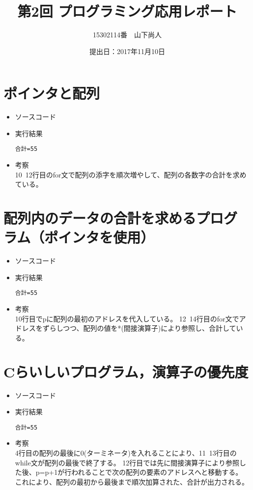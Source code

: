 \documentclass[a4paper]{jsarticle}
\title{第2回 プログラミング応用レポート}
\author{15302114番　山下尚人}
\date{提出日：2017年11月10日}
\begin{document}
\maketitle%

\section{ポインタと配列}
	\begin{itemize}
	\item ソースコード
		 
		\mbox{}\newline
	\item 実行結果
		\begin{lstlisting}
合計=55
		\end{lstlisting}
		\mbox{}\newline
	\item 考察\mbox{}\\
		10~12行目のfor文で配列の添字を順次増やして、配列の各数字の合計を求めている。
	\end{itemize}
	\newpage	%


\section{配列内のデータの合計を求めるプログラム（ポインタを使用）}
	\begin{itemize}
	\item ソースコード
		
		\mbox{}\newline
	\item 実行結果
		\begin{lstlisting}
合計=55
		\end{lstlisting}
		\mbox{}\newline
	\item 考察\mbox{}\\
		10行目でpに配列の最初のアドレスを代入している。
		12~14行目のfor文でアドレスをずらしつつ、配列の値を*(間接演算子)により参照し、合計している。
	\end{itemize}
	\newpage	%


\section{Cらいしいプログラム，演算子の優先度}
	\begin{itemize}
	\item ソースコード
		
		\mbox{}\newline
	\item 実行結果
		\begin{lstlisting}
合計=55
		\end{lstlisting}
		\mbox{}\newline
	\item 考察\mbox{}\\
		4行目の配列の最後に0(ターミネータ)を入れることにより、11~13行目のwhile文が配列の最後で終了する。
		12行目では先に間接演算子により参照した後、p=p+1が行われることで次の配列の要素のアドレスへと移動する。\\
		これにより、配列の最初から最後まで順次加算された、合計が出力される。
	\end{itemize}
\end{document}
